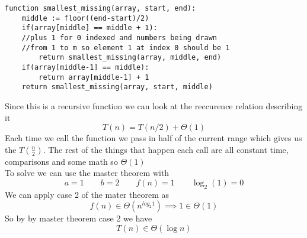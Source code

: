 \documentclass{article}
\begin{document}
\begin{lstlisting}
function smallest_missing(array, start, end):
    middle := floor((end-start)/2)
    if(array[middle] == middle + 1):
    //plus 1 for 0 indexed and numbers being drawn
    //from 1 to m so element 1 at index 0 should be 1
        return smallest_missing(array, middle, end)
    if(array[middle-1] == middle):
        return array[middle-1] + 1
    return smallest_missing(array, start, middle)
\end{lstlisting}
Since this is a recursive function we can look at the reccurence relation describing it
$$ T(n) = T(n/2) + \Theta(1) $$
Each time we call the function we pass in half of the current range which gives us the $T(\frac{n}{2})$.
The rest of the things that happen each call are all constant time, comparisons and some math so $\Theta(1)$ \\
To solve we can use the master theorem with
$$ a = 1 \qquad b = 2 \qquad f(n) = 1 \qquad \log_{2}(1) = 0 $$
We can apply case 2 of the mater theorem as
$$ f(n) \in \Theta(n^{log_{2}{1}}) \implies 1 \in \Theta(1) $$
So by by master theorem case 2 we have
$$ T(n) \in \Theta(\log{n}) $$
\end{document}
